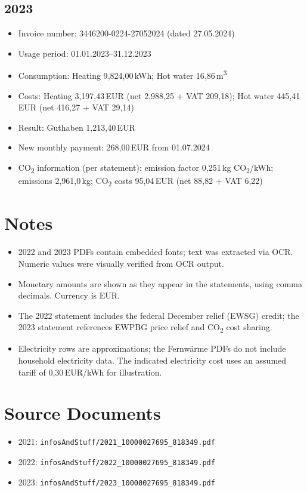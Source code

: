 \documentclass[11pt,a4paper]{article}
\begin{document}
\subsection*{2023}
\begin{itemize}
  \item Invoice number: 3446200-0224-27052024 (dated 27.05.2024)
  \item Usage period: 01.01.2023--31.12.2023
  \item Consumption: Heating 9{,}824{,}00\,kWh; Hot water 16{,}86\,m\textsuperscript{3}
  \item Costs: Heating 3{,}197{,}43\,EUR (net 2{,}988{,}25 + VAT 209{,}18); Hot water 445{,}41\,EUR (net 416{,}27 + VAT 29{,}14)
  \item Result: Guthaben 1{,}213{,}40\,EUR
  \item New monthly payment: 268{,}00\,EUR from 01.07.2024
  \item CO\textsubscript{2} information (per statement): emission factor 0{,}251\,kg CO\textsubscript{2}/kWh; emissions 2{,}961{,}0\,kg; CO\textsubscript{2} costs 95{,}04\,EUR (net 88{,}82 + VAT 6{,}22)
\end{itemize}

\section*{Notes}
\begin{itemize}
  \item 2022 and 2023 PDFs contain embedded fonts; text was extracted via OCR. Numeric values were visually verified from OCR output.
  \item Monetary amounts are shown as they appear in the statements, using comma decimals. Currency is EUR.
\item The 2022 statement includes the federal December relief (EWSG) credit; the 2023 statement references EWPBG price relief and CO\textsubscript{2} cost sharing.
\item Electricity rows are approximations; the Fernw\"arme PDFs do not include household electricity data. The indicated electricity cost uses an assumed tariff of 0{,}30\,EUR/kWh for illustration.
\end{itemize}

\section*{Source Documents}
\begin{itemize}
  \item 2021: \texttt{infosAndStuff/2021\_10000027695\_818349.pdf}
  \item 2022: \texttt{infosAndStuff/2022\_10000027695\_818349.pdf}
  \item 2023: \texttt{infosAndStuff/2023\_10000027695\_818349.pdf}
\end{itemize}
\end{document}
